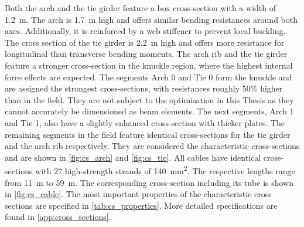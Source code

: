 Both the arch and the tie girder feature a box cross-section with a width of \SI{1.2}{m}. The arch is \SI{1.7}{m} high and offers similar bending resistances around both axes. Additionally, it is reinforced by a web stiffener to prevent local buckling. The cross section of the tie girder is \SI{2.2}{m} high and offers more resistance for longitudinal than transverse bending moments. The arch rib and the tie girder feature a stronger cross-section in the knuckle region, where the highest internal force effects are expected. The segments Arch 0 and Tie 0 form the knuckle and are assigned the strongest cross-sections, with resistances roughly 50\% higher than in the field. They are not subject to the optimisation in this Thesis as they cannot accurately be dimensioned as beam elements. The next segments, Arch 1 and Tie 1, also have a slightly enhanced cross-section with thicker plates. The remaining segments in the field feature identical cross-sections for the tie girder and the arch rib respectively. They are considered the characteristic cross-sections and are shown in \cref{fig:cs_arch} and \cref{fig:cs_tie}. All cables have identical cross-sections with 27 high-strength strands of \SI{140}{mm^2}. The respective lengths range from \SI{11}{m} to \SI{59}{m}. The corresponding cross-section including its tube is shown in \cref{fig:cs_cable}. The most important properties of the characteristic cross sections are specified in \cref{tab:cs_properties}. More detailed specifications are found in \cref{app:cross_sections}.

